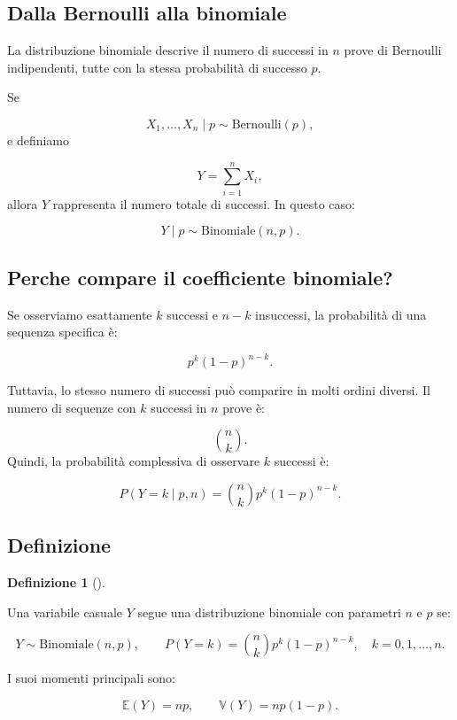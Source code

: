 \documentclass[
  italian,
  letterpaper,
  a4paper,
  11pt,
  open=any]{scrbook}
\theoremstyle{plain}
\theoremstyle{definition}
\theoremstyle{definition}
\newtheorem{definition}{Definizione}[chapter]
\theoremstyle{remark}
\begin{document}
\subsection{Dalla Bernoulli alla
binomiale}\label{dalla-bernoulli-alla-binomiale}

La distribuzione binomiale descrive il numero di successi in \(n\) prove
di Bernoulli indipendenti, tutte con la stessa probabilità di successo
\(p\).

Se

\[
X_1,\ldots,X_n \mid p \sim \mathrm{Bernoulli}(p),
\] e definiamo

\[
Y = \sum_{i=1}^n X_i,
\] allora \(Y\) rappresenta il numero totale di successi. In questo
caso:

\[
Y \mid p \sim \mathrm{Binomiale}(n,p).
\]

\subsection{Perche compare il coefficiente
binomiale?}\label{perche-compare-il-coefficiente-binomiale}

Se osserviamo esattamente \(k\) successi e \(n-k\) insuccessi, la
probabilità di una sequenza specifica è:

\[
p^k(1-p)^{n-k}.
\]

Tuttavia, lo stesso numero di successi può comparire in molti ordini
diversi. Il numero di sequenze con \(k\) successi in \(n\) prove è:

\[
\binom{n}{k}.
\] Quindi, la probabilità complessiva di osservare \(k\) successi è:

\[
P(Y=k \mid p,n) = \binom{n}{k}p^k(1-p)^{n-k}.
\]

\subsection{Definizione}\label{definizione-2}

\begin{definition}[]\protect\hypertarget{def-binomial}{}\label{def-binomial}

Una variabile casuale \(Y\) segue una distribuzione binomiale con
parametri \(n\) e \(p\) se:

\[
Y \sim \mathrm{Binomiale}(n,p),
\qquad
P(Y=k)=\binom{n}{k}p^k(1-p)^{n-k},
\quad k=0,1,\ldots,n.
\]

I suoi momenti principali sono:

\[
\mathbb{E}(Y)=np,
\qquad
\mathbb{V}(Y)=np(1-p).
\]

\end{definition}
\end{document}
